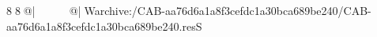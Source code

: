 8  8  @|                                                   @| W   archive:/CAB-aa76d6a1a8f3cefdc1a30bca689be240/CAB-aa76d6a1a8f3cefdc1a30bca689be240.resS 